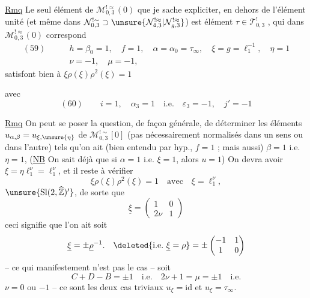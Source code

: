 \uline{Rmq} Le seul élément de
$\mathcal M_{0,3}^{!\approx}(0)$
que je sache expliciter, en dehors de l'élément unité
(et  même dans
$\mathcal N_{0,3}^{!\sim}\supset
\unsure{\mathcal N_{4,3}^{!\approx}|\mathcal N_{g,3}^{!\approx}}$)
est  élément
$\tau\in\mathcal T_{0,3}^{!}$
,
qui dans $\mathcal M_{0,3}^{!\approx}(0)$ correspond
\[
\begin{aligned}
(59)\qquad & h=\beta_0=1,\quad f=1,\quad
\alpha=\alpha_0=\tau_\infty,\quad
\xi=g=\ell_1^{-1},\quad\eta=1
\\
&\nu=-1,\quad\mu=-1,
\end{aligned}
\]
satisfont bien à 
\uline{$\xi\rho(\xi)
\rho^2(\xi)=1$}
\deleted{
\[
\widehat\varphi(\xi)=\ell_0,\qquad
\widehat\varphi\bigl(\unsure{\rho^{-1}}(\xi^{-1})\bigr)
=\unsure{\varepsilon_0},
\]
\[
\widehat\varphi\bigl(\rho^{-1}(\xi^{-1})\bigr)
\rho\bigl(\widehat\varphi(\rho^{-1}(\xi^{-1}))\bigr)^{-1}
=\unsure{\varepsilon_0\varepsilon_1^{-1}}
=(\sigma_\infty\rho)(\rho\sigma_\infty)^{-1}.
\]
}


avec
\[
(60)\qquad i=1,\quad\alpha_3=1\quad\text{i.e.}\quad
\varepsilon_3=-1,\quad j'=-1
\]

\uline{Rmq} On peut se poser la question, de façon générale,
de déterminer les éléments
$u_{\alpha,\beta}=u_{\xi,\unsure{\eta}}$
de $\mathcal M_{0,3}^{!\sim}[0]$
(pas nécessairement normalisés dans un sens ou dans l'autre)
tels qu'on ait (bien entendu par hyp., $f=1$ ; mais aussi)
 $\beta=1$ i.e. $\eta=1$,
 
(\uline{NB} On sait déjà que si $\alpha=1$ i.e.
$\xi=1$, alors $u=1$)
On devra avoir
$\xi=\eta\ell_1^\nu=\ell_1^\nu$,
et il reste à vérifier
\[
\xi\rho(\xi)
\rho^2(\xi)=1\quad\text{avec}\quad
\xi=\ell_1^\nu,
\]
$\unsure{\mathrm{Sl}(2,\widehat{\mathbb Z})'}$,
 de sorte que
\[
\underline{\xi}=
\begin{pmatrix}1&0\\2\nu&1\end{pmatrix}
\]
ceci signifie  que l'on ait soit
\[
\underline{\xi}=\pm\underline\rho^{-1}.
\quad\deleted{\text{i.e.}\ \underline{\xi}=\rho}
=\pm\begin{pmatrix}-1&1\\1&0\end{pmatrix}
\]
-- ce qui manifestement n'est pas le cas -- soit
\[
C+D-B=\pm1\quad\text{i.e.}\quad2\nu+1=\mu=\pm1\quad\text{i.e.}
\]
$\nu=0$ ou $-1$ -- ce sont les deux cas triviaux
$u_{\xi}=\mathrm{id}$ et
$u_{\xi}=\tau_\infty$.


